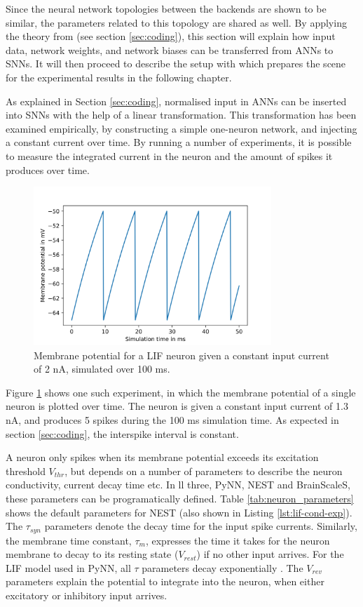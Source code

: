 Since the neural network topologies between the backends are shown to be similar,
the parameters related to this topology are shared as well.
By applying the theory from \textcite{Rueckauer2017} (see section
\ref{sec:coding}), this section will explain how input data, network weights,
and network biases can be transferred from \glspl{ANN} to \glspl{SNN}.
It will then proceed to describe the setup with which prepares the scene for the
experimental results in the following chapter.

As explained in Section \ref{sec:coding}, normalised input in \glspl{ANN} can
be inserted into \glspl{SNN} with the help of a linear transformation.
This transformation has been examined empirically, by constructing a simple 
one-neuron network, and injecting a constant current over time.
By running a number of experiments, it is possible to measure the integrated
current in the neuron and the amount of spikes it produces over time.

\begin{figure}
  \centering
  \includegraphics[width=0.8\textwidth]{images/membrane.png}
  \caption{Membrane potential for a LIF neuron given a constant input current of
  2 nA, simulated over 100 ms.}
  \label{fig:membrane}
\end{figure}

Figure \ref{fig:membrane} shows one such experiment, in which the membrane
potential of a single neuron is plotted over time.
The neuron is given a constant input current of 1.3 nA, and 
produces 5 spikes during the 100 ms simulation time. 
As expected in section \ref{sec:coding}, the interspike interval is constant.

A neuron only spikes when its membrane potential exceeds its excitation threshold
$V_{thr}$, but depends on a number of parameters to describe the neuron
conductivity, current decay time etc.
In ll three, PyNN, NEST and BrainScaleS, these parameters can be programatically
defined. Table \ref{tab:neuron_parameters} shows the default parameters for
NEST (also shown in Listing \ref{lst:lif-cond-exp}).
The $\tau_{syn}$ parameters denote the decay time for the input spike currents. 
Similarly, the membrane time constant, $\tau_m$, expresses the time it takes for the
neuron membrane to decay to its resting state ($V_{rest}$) if no other
input arrives. 
For the LIF model used in PyNN,
all $\tau$ parameters decay exponentially \cite{Davison2009}.
The $V_{rev}$ parameters explain the potential to integrate into the neuron,
when either excitatory or inhibitory input arrives. 

